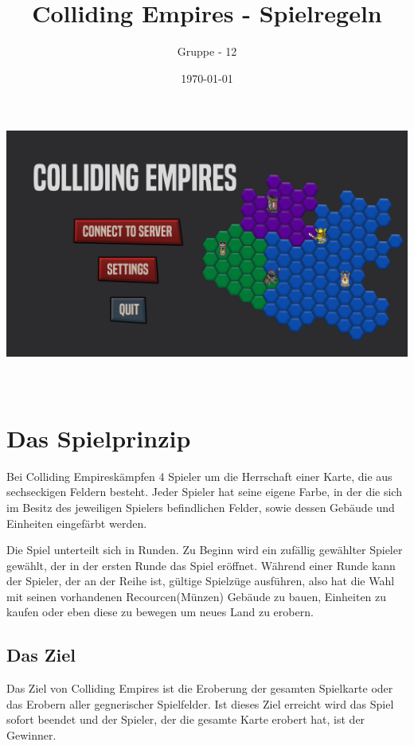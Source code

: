 \documentclass[12pt,a4paper]{article}
\title{Colliding Empires - Spielregeln}
\author{Gruppe - 12}
\date{\today}
\begin{document}
\makeatletter
    \begin{titlepage}
        \begin{center}
            \includegraphics[width=1.0\linewidth]{img/titleimage.png}\\[5ex]
            {\huge \bfseries  \@title }\\[2ex] 
            {\LARGE  \@author}\\[50ex] 
            {\large \@date}
        \end{center}
    \end{titlepage}
\makeatother    
    
\newpage
\tableofcontents
\newpage

\section{Das Spielprinzip}

Bei \glqq Colliding Empires\grqq  kämpfen 4 Spieler um die Herrschaft einer Karte, die aus sechseckigen Feldern besteht. Jeder Spieler hat seine eigene Farbe, in der die sich im Besitz des jeweiligen Spielers befindlichen Felder, sowie dessen Gebäude und Einheiten eingefärbt werden.

Die Spiel unterteilt sich in Runden. Zu Beginn wird ein zufällig gewählter Spieler gewählt, der in der ersten Runde das Spiel eröffnet. Während einer Runde kann der Spieler, der an der Reihe ist, gültige Spielzüge ausführen, also hat die Wahl mit seinen vorhandenen Recourcen(Münzen) Gebäude zu bauen, Einheiten zu kaufen oder eben diese zu bewegen um neues Land zu erobern.

\subsection{Das Ziel}
Das Ziel von Colliding Empires ist die Eroberung der gesamten Spielkarte oder das Erobern aller gegnerischer Spielfelder. Ist dieses Ziel erreicht wird das Spiel sofort beendet und der Spieler, der die gesamte Karte erobert hat, ist der Gewinner.
\end{document}
